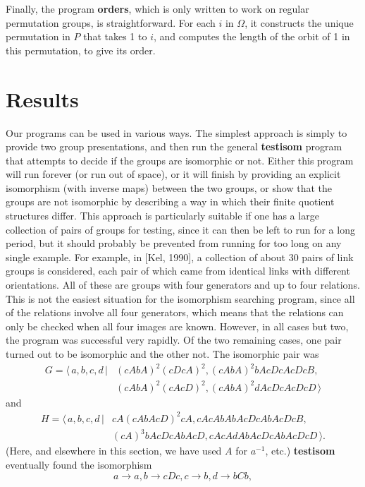 Finally, the program {\bf orders}, which is only written to work on regular
permutation groups, is straightforward. For each $i$ in $\Omega$, it
constructs the unique permutation in $P$ that takes  1  to $i$,  and computes
the length of the orbit of  1  in this permutation, to give its order.
\section{Results}

Our programs can be used in various ways. The simplest approach is simply to
provide two group presentations, and then run the general {\bf testisom}
program that attempts to decide if the groups are isomorphic or not. Either
this program will run forever (or run out of space), or it will finish by
providing an explicit isomorphism (with inverse maps) between the two groups,
or show that the groups are not isomorphic by describing a way in which
their finite quotient structures differ. This approach is particularly suitable
if one has a large collection of pairs of groups for testing, since it can
then be left to run for a long period, but it should probably be prevented
from running for too long on any single example. For example,
in [Kel, 1990], a collection of about 30 pairs of link groups is considered,
each pair of which came from identical links with different
orientations. All of these are groups with four generators and up to
four relations.
This is not the easiest situation for the isomorphism searching program,
since all of the relations involve all four generators, which means that the
relations can only be checked when all four images are known. However, in
all cases but two, the program was successful very rapidly. Of the two
remaining cases, one pair turned out to be isomorphic and the other not.
The isomorphic pair was
\begin{eqnarray*}
G  =  \langle \, a,b,c,d \, | &  (cAbA)^2(cDcA)^2, (cAbA)^2bAcDcAcDcB, \\
 & (cAbA)^2(cAcD)^2, (cAbA)^2dAcDcAcDcD \, \rangle
\end{eqnarray*}
and
\begin{eqnarray*}
H = \langle \, a,b,c,d \, | & cA(cAbAcD)^2cA, cAcAbAbAcDcAbAcDcB, \\
  & (cA)^3bAcDcAbAcD, cAcAdAbAcDcAbAcDcD \, \rangle.
\end{eqnarray*}
(Here, and elsewhere in this section, we have used  $A$  for  $a^{-1}$, etc.)
{\bf testisom} eventually found the isomorphism
\begin{displaymath}
a \rightarrow a, b \rightarrow cDc,
c \rightarrow b, d \rightarrow bCb,
\end{displaymath}
